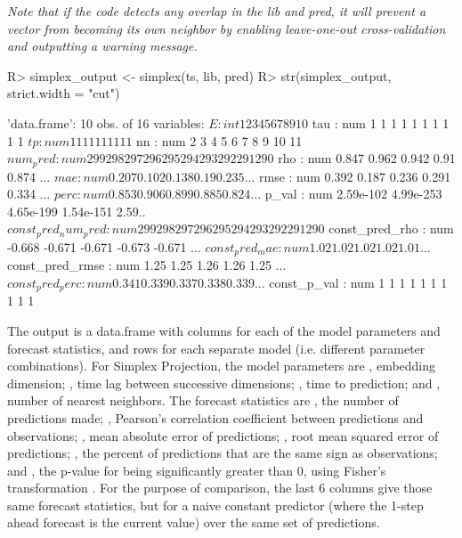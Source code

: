 \documentclass[article]{jss}
\begin{document}
\emph{Note that if the code detects any overlap in the lib and pred, it will prevent a vector from becoming its own neighbor by enabling leave-one-out cross-validation and outputting a warning message.}

\begin{Schunk}
\begin{Sinput}
R> simplex_output <- simplex(ts, lib, pred)
R> str(simplex_output, strict.width = "cut")
\end{Sinput}
\begin{Soutput}
'data.frame':	10 obs. of  16 variables:
 $ E                  : int  1 2 3 4 5 6 7 8 9 10
 $ tau                : num  1 1 1 1 1 1 1 1 1 1
 $ tp                 : num  1 1 1 1 1 1 1 1 1 1
 $ nn                 : num  2 3 4 5 6 7 8 9 10 11
 $ num_pred           : num  299 298 297 296 295 294 293 292 291 290
 $ rho                : num  0.847 0.962 0.942 0.91 0.874 ...
 $ mae                : num  0.207 0.102 0.138 0.19 0.235 ...
 $ rmse               : num  0.392 0.187 0.236 0.291 0.334 ...
 $ perc               : num  0.853 0.906 0.899 0.885 0.824 ...
 $ p_val              : num  2.59e-102 4.99e-253 4.65e-199 1.54e-151 2.59..
 $ const_pred_num_pred: num  299 298 297 296 295 294 293 292 291 290
 $ const_pred_rho     : num  -0.668 -0.671 -0.671 -0.673 -0.671 ...
 $ const_pred_mae     : num  1.02 1.02 1.02 1.02 1.01 ...
 $ const_pred_rmse    : num  1.25 1.25 1.26 1.26 1.25 ...
 $ const_pred_perc    : num  0.341 0.339 0.337 0.338 0.339 ...
 $ const_p_val        : num  1 1 1 1 1 1 1 1 1 1
\end{Soutput}
\end{Schunk}

The output is a data.frame with columns for each of the model parameters and forecast statistics, and rows for each separate model (i.e. different parameter combinations). For Simplex Projection, the model parameters are , embedding dimension; , time lag between successive dimensions; , time to prediction; and , number of nearest neighbors. The forecast statistics are , the number of predictions made; , Pearson's correlation coefficient between predictions and observations; , mean absolute error of predictions; , root mean squared error of predictions; , the percent of predictions that are the same sign as observations; and , the p-value for  being significantly greater than 0, using Fisher's transformation \cite{Fisher_1915}. For the purpose of comparison, the last 6 columns give those same forecast statistics, but for a naive constant predictor (where the 1-step ahead forecast is the current value) over the same set of predictions.
\end{document}
